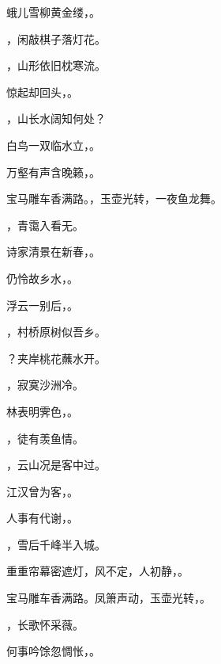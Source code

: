 \documentclass[12pt, a4paper, addpoints]{exam}
\begin{document}
\begin{questions}
\question[2] 蛾儿雪柳黄金缕，\uline{\qquad\qquad\qquad\qquad}。

\question[2] \uline{\qquad\qquad\qquad\qquad}，闲敲棋子落灯花。

\question[2] \uline{\qquad\qquad\qquad\qquad}，山形依旧枕寒流。

\question[2] 惊起却回头，\uline{\qquad\qquad\qquad\qquad}。

\question[2] \uline{\qquad\qquad\qquad\qquad}，山长水阔知何处？

\question[2] 白鸟一双临水立，\uline{\qquad\qquad\qquad\qquad}。

\question[2] 万壑有声含晚籁，\uline{\qquad\qquad\qquad\qquad}。

\question[2] 宝马雕车香满路。\uline{\qquad\qquad\qquad\qquad}，玉壶光转，一夜鱼龙舞。

\question[2] \uline{\qquad\qquad\qquad\qquad}，青霭入看无。

\question[2] 诗家清景在新春，\uline{\qquad\qquad\qquad\qquad}。

\question[2] 仍怜故乡水，\uline{\qquad\qquad\qquad\qquad}。

\question[1] 浮云一别后，\uline{\qquad\qquad\qquad\qquad}。

\question[2] \uline{\qquad\qquad\qquad\qquad}，村桥原树似吾乡。

\question[2] \uline{\qquad\qquad\qquad\qquad}？夹岸桃花蘸水开。

\question[2] \uline{\qquad\qquad\qquad\qquad}，寂寞沙洲冷。

\question[2] 林表明霁色，\uline{\qquad\qquad\qquad\qquad}。

\question[2] \uline{\qquad\qquad\qquad\qquad}，徒有羡鱼情。

\question[1] \uline{\qquad\qquad\qquad\qquad}，云山况是客中过。

\question[1] 江汉曾为客，\uline{\qquad\qquad\qquad\qquad}。

\question[2] 人事有代谢，\uline{\qquad\qquad\qquad\qquad}。

\question[2] \uline{\qquad\qquad\qquad\qquad}，雪后千峰半入城。

\question[2] 重重帘幕密遮灯，风不定，人初静，\uline{\qquad\qquad\qquad\qquad}。

\question[2] 宝马雕车香满路。凤箫声动，玉壶光转，\uline{\qquad\qquad\qquad\qquad}。

\question[2] \uline{\qquad\qquad\qquad\qquad}，长歌怀采薇。

\question[2] 何事吟馀忽惆怅，\uline{\qquad\qquad\qquad\qquad}。

\end{questions}
\end{document}
